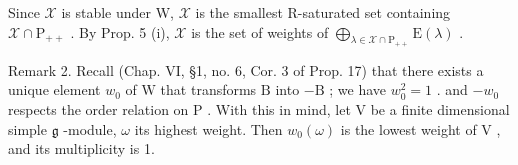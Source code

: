 Since \(\mathcal{X}\) is stable under W, \(\mathcal{X}\) is the smallest R-saturated set containing \(\mathcal{X} \cap \mathrm{P}_{++}\) . By Prop. 5 (i), \(\mathcal{X}\) is the set of weights of \(\bigoplus_{\lambda \in \mathcal{X} \cap \mathrm{P}_{++}} \mathrm{E}(\lambda)\) .

Remark 2. Recall (Chap. VI, §1, no. 6, Cor. 3 of Prop. 17) that there exists a unique element \(w_0\) of \(\mathrm{W}\) that transforms \(\mathrm{B}\) into \(-\mathrm{B}\) ; we have \(w_0^2 = 1\) . and \(-w_0\) respects the order relation on \(\mathrm{P}\) . With this in mind, let \(\mathrm{V}\) be a finite dimensional simple \(\mathfrak{g}\) -module, \(\omega\) its highest weight. Then \(w_0(\omega)\) is the lowest weight of \(\mathrm{V}\) , and its multiplicity is 1.

